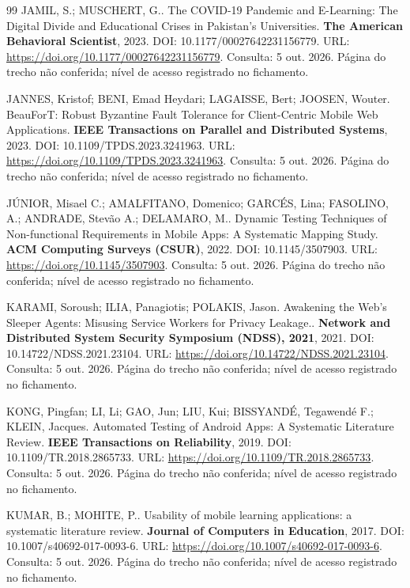 \begin{thebibliography}{99}
 JAMIL, S.; MUSCHERT, G.. The COVID-19 Pandemic and E-Learning: The Digital Divide and Educational Crises in Pakistan’s Universities. \textbf{The American Behavioral Scientist}, 2023. DOI: 10.1177/00027642231156779. URL: \url{https://doi.org/10.1177/00027642231156779}. Consulta: 5 out. 2026. Página do trecho não conferida; nível de acesso registrado no fichamento.

 JANNES, Kristof; BENI, Emad Heydari; LAGAISSE, Bert; JOOSEN, Wouter. BeauForT: Robust Byzantine Fault Tolerance for Client-Centric Mobile Web Applications. \textbf{IEEE Transactions on Parallel and Distributed Systems}, 2023. DOI: 10.1109/TPDS.2023.3241963. URL: \url{https://doi.org/10.1109/TPDS.2023.3241963}. Consulta: 5 out. 2026. Página do trecho não conferida; nível de acesso registrado no fichamento.

 JÚNIOR, Misael C.; AMALFITANO, Domenico; GARCÉS, Lina; FASOLINO, A.; ANDRADE, Stevão A.; DELAMARO, M.. Dynamic Testing Techniques of Non-functional Requirements in Mobile Apps: A Systematic Mapping Study. \textbf{ACM Computing Surveys (CSUR)}, 2022. DOI: 10.1145/3507903. URL: \url{https://doi.org/10.1145/3507903}. Consulta: 5 out. 2026. Página do trecho não conferida; nível de acesso registrado no fichamento.

 KARAMI, Soroush; ILIA, Panagiotis; POLAKIS, Jason. Awakening the Web's Sleeper Agents: Misusing Service Workers for Privacy Leakage.. \textbf{Network and Distributed System Security Symposium (NDSS), 2021}, 2021. DOI: 10.14722/NDSS.2021.23104. URL: \url{https://doi.org/10.14722/NDSS.2021.23104}. Consulta: 5 out. 2026. Página do trecho não conferida; nível de acesso registrado no fichamento.

 KONG, Pingfan; LI, Li; GAO, Jun; LIU, Kui; BISSYANDÉ, Tegawendé F.; KLEIN, Jacques. Automated Testing of Android Apps: A Systematic Literature Review. \textbf{IEEE Transactions on Reliability}, 2019. DOI: 10.1109/TR.2018.2865733. URL: \url{https://doi.org/10.1109/TR.2018.2865733}. Consulta: 5 out. 2026. Página do trecho não conferida; nível de acesso registrado no fichamento.

 KUMAR, B.; MOHITE, P.. Usability of mobile learning applications: a systematic literature review. \textbf{Journal of Computers in Education}, 2017. DOI: 10.1007/s40692-017-0093-6. URL: \url{https://doi.org/10.1007/s40692-017-0093-6}. Consulta: 5 out. 2026. Página do trecho não conferida; nível de acesso registrado no fichamento.


\end{thebibliography}
